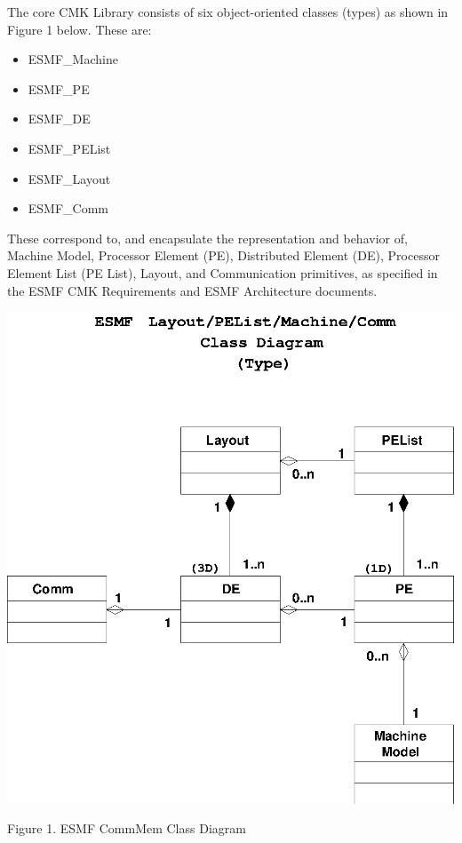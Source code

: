 

The core CMK Library consists of six object-oriented classes (types)
as shown in Figure 1 below.  These are:

\begin{itemize}
\item ESMF\_Machine
\item ESMF\_PE
\item ESMF\_DE
\item ESMF\_PEList
\item ESMF\_Layout
\item ESMF\_Comm
\end{itemize}

These correspond to, and encapsulate the representation and
behavior of, Machine Model, Processor Element (PE), Distributed Element (DE),
Processor Element List (PE List), Layout, and Communication primitives, as
specified in the ESMF CMK Requirements and ESMF Architecture documents.

\begin{center}
\includegraphics{CommMemClass.EPS}

Figure 1.  ESMF CommMem Class Diagram

\end{center}

